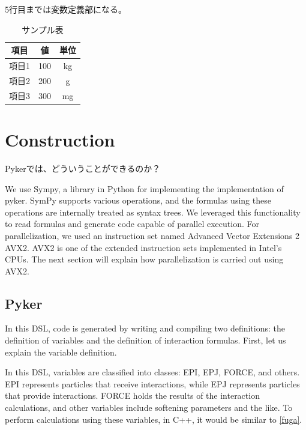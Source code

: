 \documentclass[ams, a4j]{U-AizuGT}
\begin{document}
5行目までは変数定義部になる。



\begin{table}[ht]
  \centering %
  \caption{サンプル表} %
  \label{tab:sampleTable}
  \begin{tabular}{ccc} %
  \toprule
  項目 & 値 & 単位 \\
  \midrule
  項目1 & 100 & kg \\
  項目2 & 200 & g \\
  項目3 & 300 & mg \\
\bottomrule
\end{tabular}
\end{table}



\section{Construction}
Pykerでは、どういうことができるのか？


We use Sympy, a library in Python for implementing  the implementation of pyker.
SymPy supports various operations, and the formulas using these operations are internally treated as 
syntax trees. We leveraged this functionality to read formulas and generate code capable of parallel execution.
For parallelization, we used an instruction set named Advanced Vector Extensions 2 \lparen AVX2\rparen. AVX2 is one of the 
extended instruction sets implemented in Intel's CPUs. The next section will explain how parallelization is carried out using AVX2.



\subsection{Pyker}
In this DSL, code is generated by writing and compiling two definitions: the definition of variables and the definition of interaction formulas. First, let us explain the variable definition.


In this DSL, variables are classified into classes: EPI, EPJ, FORCE, and others. EPI represents particles that receive interactions, 
while EPJ represents particles that provide interactions. FORCE holds the results of the interaction calculations, and other variables 
include softening parameters and the like. To perform calculations using these variables, in C++, it would be similar to \ref{fuga}.
\end{document}
